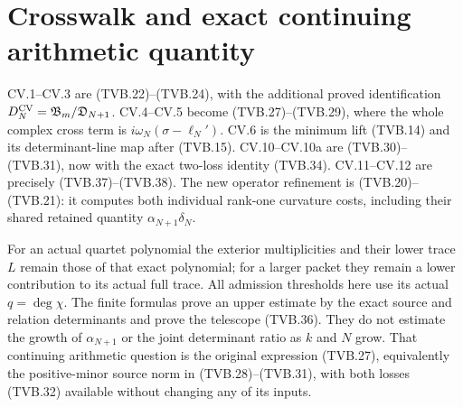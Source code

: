 \documentclass[11pt]{article}
\begin{document}
\section{Crosswalk and exact continuing arithmetic quantity}

CV.1--CV.3 are (TVB.22)--(TVB.24), with the additional proved
identification $D_N^{\rm CV}=\mathfrak B_m/\mathfrak D_{N+1}$.
CV.4--CV.5 become (TVB.27)--(TVB.29), where the whole complex
cross term is $i\omega_N(\sigma-\ell_N')$.
CV.6 is the minimum lift (TVB.14) and its determinant-line map
after (TVB.15). CV.10--CV.10a are (TVB.30)--(TVB.31), now with
the exact two-loss identity (TVB.34). CV.11--CV.12 are precisely
(TVB.37)--(TVB.38). The new operator refinement is (TVB.20)--(TVB.21):
it computes both individual rank-one curvature costs, including
their shared retained quantity $\alpha_{N+1}\delta_N$.

For an actual quartet polynomial the exterior multiplicities and
their lower trace $L$ remain those of that exact polynomial; for a
larger packet they remain a lower contribution to its actual full
trace. All admission thresholds here use its actual $q=\deg\chi$.
The finite formulas prove an upper estimate by the exact source and
relation determinants and prove the telescope (TVB.36). They do not
estimate the growth of $\alpha_{N+1}$ or the joint determinant
ratio as $k$ and $N$ grow. That continuing arithmetic question is
the original expression (TVB.27), equivalently the positive-minor
source norm in (TVB.28)--(TVB.31), with both losses (TVB.32)
available without changing any of its inputs.
\end{document}
